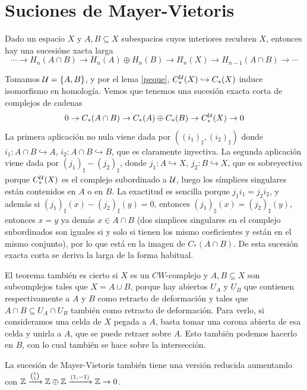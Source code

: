\documentclass[TA.tex]{subfiles}
\begin{document}
\section{Suciones de Mayer-Vietoris}
\begin{teorema}
Dado un espacio $X$ y $A,B\subseteq X$ subespacios cuyos interiores recubren $X$, entonces hay una sucesióne xacta larga
\[
\cdots\to H_n(A\cap B)\to H_n(A)\oplus H_n(B)\to H_n(X)\to H_{n-1}(A\cap B)\to\cdots
\]
\end{teorema}
\begin{dem}
 Tomamos $\mathcal{U}=\{A,B\}$, y por el lema \ref{peque}, $C^{\mathcal{U}}_*(X)\hookrightarrow C_*(X)$ induce isomorfismo en homología. Vemos que tenemos una sucesión exacta corta de complejos de cadenas
 \[
 0\to C_*(A\cap B)\to C_*(A)\oplus C_*(B)\to C_*^{\mathcal{U}}(X)\to 0
 \]
La primera aplicación no nula viene dada por $((i_1)_\sharp, (i_2)_\sharp)$ donde $i_1:A\cap B\hookrightarrow A$, $i_2:A\cap B\hookrightarrow B$, que es claramente inyectiva. La segunda aplicación viene dada por $(j_1)_\sharp-(j_2)_\sharp$, donde $j_1:A\hookrightarrow X$, $j_2:B\hookrightarrow X$, que es sobreyectiva porque $C_*^{\mathcal{U}}(X)$ es el complejo subordinado a $\mathcal{U}$, luego los símplices singulares están contenidos en $A$ o en $B$. La exactitud es sencilla porque $j_1i_1=j_2i_2$, y además si $(j_1)_\sharp(x)-(j_2)_\sharp(y)=0$, entonces $(j_1)_\sharp(x)=(j_2)_\sharp(y)$, entonces $x=y$ ya demás $x\in A\cap B$ (dos simplices singulares en el complejo subordinados son iguales si y solo si tienen los mismo coeficientes y están en el mismo conjunto), por lo que está en la imagen de $C_*(A\cap B)$. De esta sucesión exacta corta se deriva la larga de la forma habitual.
\end{dem}

\begin{nota}
El teorema también es cierto si $X$ es un $CW$-complejo y $A,B\subseteq X$ son subcomplejos tales que $X=A\cup B$, porque hay abiertos $U_A$ y $U_B$ que contienen respectivamente a $A$ y $B$ como retracto de deformación y tales que $A\cap B\subseteq U_A\cap U_B$ también como retracto de deformación. Para verlo, si consideramos una celda de $X$ pegada a $A$, basta tomar una corona abierta de esa celda y unirla a $A$, que se puede retraer sobre $A$. Esto también podemos hacerlo en $B$, con lo cual también se hace sobre la intersección. 
\end{nota}

La sucesión de Mayer-Vietoris también tiene una versión reducida aumentando con $\mathbb{Z}\xrightarrow{\binom{1}{1}}\mathbb{Z}\oplus\mathbb{Z}\xrightarrow{(1,-1)}\mathbb{Z}\to 0$. 
\end{document}
